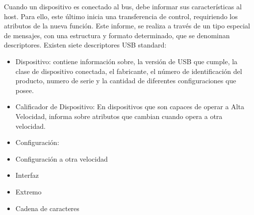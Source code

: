 Cuando un dispositivo es conectado al bus, debe informar sus características al host. Para ello, este último inicia una transferencia de control, requiriendo los atributos de la nueva función. Este informe, se realiza a través de un tipo especial de mensajes, con una estructura y formato determinado, que se denominan descriptores. Existen siete descriptores USB standard:

\begin{itemize}
	\item Dispositivo: contiene información sobre, la versión de USB que cumple, la clase de dispositivo conectada, el fabricante, el número de identificación del producto, numero de serie y la cantidad de diferentes configuraciones que posee.
	\item Calificador de Dispositivo: En dispositivos que son capaces de operar a Alta Velocidad, informa sobre atributos que cambian cuando opera a otra velocidad.
	\item Configuración: 
	\item Configuración a otra velocidad
	\item Interfaz
	\item Extremo
	\item Cadena de caracteres

\end{itemize}%


